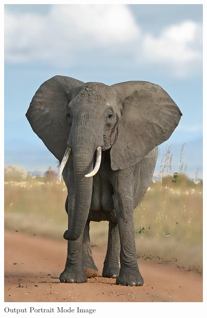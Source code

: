 \documentclass[12pt]{article}
\begin{document}
\begin{figure}[!htb]
\begin{minipage}{0.48\textwidth}
        \includegraphics[width=0.9\linewidth]{elephant_portrait.jpg}
        \caption{Output Portrait Mode Image}
    \end{minipage}\hfill
\end{figure}
\end{document}
